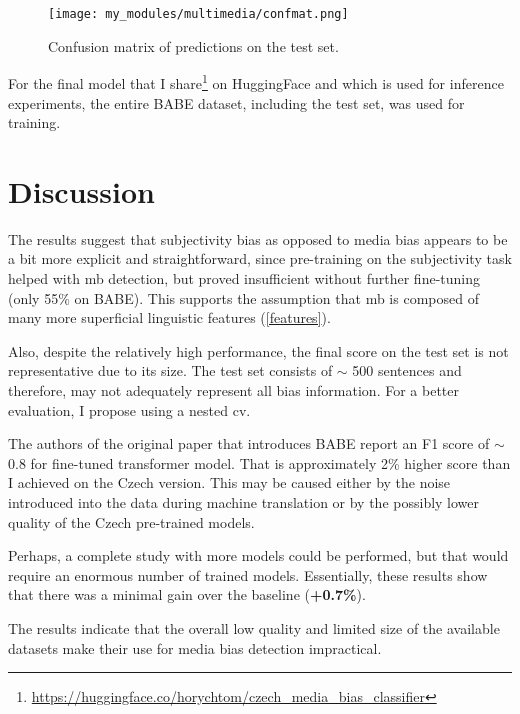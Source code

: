 \begin{figure}[h]
  \texttt{[image: my\_modules/multimedia/confmat.png]}
  \caption{Confusion matrix of predictions on the test set.}
  \label{fig:confmat}
\end{figure}

For the final model that I share\footnote{\url{https://huggingface.co/horychtom/czech_media_bias_classifier}} on HuggingFace and which is used for inference experiments, the entire BABE dataset, including the test set, was used for training.

\section{Discussion}
The results suggest that subjectivity bias as opposed to media bias appears to be a bit more explicit and straightforward, since pre-training on the subjectivity task helped with \gls{mb} detection, but proved insufficient without further fine-tuning (only 55\% on BABE). This supports the assumption that \gls{mb} is composed of many more superficial linguistic features (\ref{features}).

Also, despite the relatively high performance, the final score on the test set is not representative due to its size. The test set consists of $\sim$ 500 sentences and therefore, may not adequately represent all bias information. For a better evaluation, I propose using a nested \gls{cv}.

The authors of the original paper that introduces BABE \cite{spinde2021neural} report an F1 score of $\sim$ 0.8 for fine-tuned transformer model. That is approximately 2\% higher score than I achieved on the Czech version. This may be caused either by the noise introduced into the data during machine translation or by the possibly lower quality of the Czech pre-trained models.

Perhaps, a complete study with more models could be performed, but that would require an enormous number of trained models. Essentially, these results show that there was a minimal gain over the baseline (\textbf{+0.7\%}).

The results indicate that the overall low quality and limited size of the available datasets make their use for media bias detection impractical.






